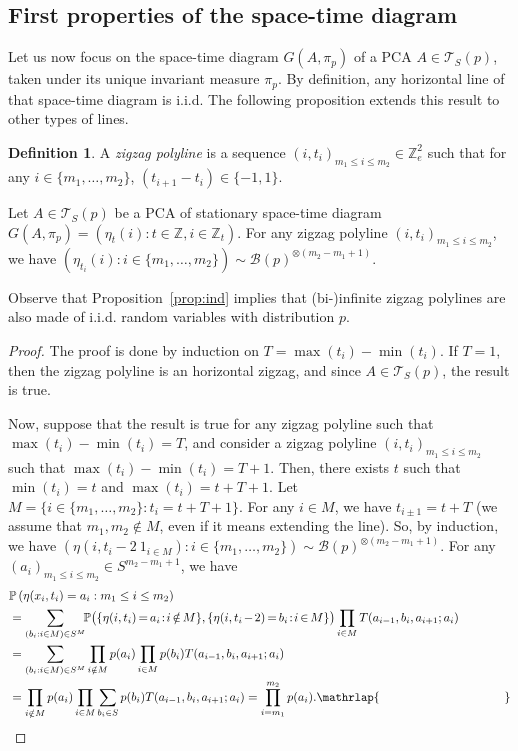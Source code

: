 \documentclass[10pt]{amsart}
\theoremstyle{definition}\newtheorem{defi}[theo]{Definition}\newtheorem{rema}[theo]{Remark}\newtheorem{exam}[theo]{Example}\newtheorem{exem}[theo]{Example}\newtheorem{nota}[theo]{Notation}
\newcounter{a}
\newcommand{\ind}[1]{1_{#1}}
\newcommand{\triang}[2]{\mathcal{T}_{#1} \left(#2 \right)}
\newcommand{\ZZ}{\mathbb{Z}}
\newcommand{\Z}{\mathbb{Z}}
\newcommand{\Pbb}{\mathbb{P}}
\newcommand*{\Mk}{\mkern -2mu}
\begin{document}
\subsection{First properties of the space-time diagram}

Let us now focus on the space-time diagram $G(A,\pi_p)$ of a PCA $A\in\triang{S}{p}$, taken under its unique invariant measure $\pi_p$. By definition, any horizontal line of that space-time diagram is i.i.d. The following proposition extends this result to other types of lines.

\begin{defi}\label{def:zigzagpolyline}
A \emph{zigzag polyline} is a sequence $(i,t_i)_{m_1\leq i\leq m_2}\in \Z_{e}^2$ such that for any $i\in\{m_1,\ldots, m_2\}$, $(t_{i+1}-t_i)\in\{-1,1\}$.
\end{defi}

\begin{prop}\label{prop:ind}
Let $A \in \triang{S}{p}$ be a PCA of stationary space-time diagram $G(A,\pi_p)=(\eta_t(i) : t \in \ZZ, i \in \ZZ_t)$. For any zigzag polyline $(i,t_i)_{m_1\leq i\leq m_2}$, we have $(\eta_{t_i}(i) : i \in \{m_1,\ldots,m_2\}) \sim \mathcal{B}(p)^{\otimes (m_2-m_1+1)}$.
\end{prop}

Observe that Proposition~\ref{prop:ind} implies that (bi-)infinite zigzag polylines are also made of i.i.d. random variables with distribution $p$.

\begin{proof}
The proof is done by induction on $T = \max(t_i) - \min(t_i)$. If $T = 1$, then the zigzag polyline is an horizontal zigzag, and since $A \in \triang{S}{p}$, the result is true.

Now, suppose that the result is true for any zigzag polyline such that $\max(t_i)-\min(t_i) = T$, and consider a zigzag polyline $(i,t_i)_{m_1\leq i\leq m_2}$ such that $\max(t_i) - \min(t_i) = T+1$. Then, there exists $t$ such that $\min(t_i) = t$ and $\max(t_i) =t+T+1$. Let $M = \{i \in \{m_1,\ldots,m_2\} : t_i = t+T+1\}$. For any $i \in M$, we have $t_{i\pm 1} = t+T$ (we assume that $m_1,m_2\notin M$, even if it means extending the line). So, by induction, we have $(\eta(i,t_i - 2\ \ind{i \in M}) : i \in \{m_1,\ldots,m_2\}) \sim \mathcal{B}(p)^{\otimes (m_2-m_1+1)}$. For any $(a_i)_{m_1 \leq i \leq m_2}\in S^{m_2-m_1+1}$, we have
\begin{align*}
&\Pbb\left(\eta(x_i,t_i) = a_i : m_1 \leq i \leq m_2\right)\\
& = \sum_{(b_i : i \in M) \in S^{M}} \!\!\Pbb\big(\{\eta(i,t_i) \Mk=\Mk a_i\!:\!i \Mk\notin\Mk M\},\{\eta(i,t_i\Mk-\Mk2) \Mk=\Mk b_i\!:\!i \Mk\in\Mk M\}\big) \prod_{i \in M} T(a_{i-1},b_i,a_{i+1} ; a_i) \\
& = \sum_{(b_i : i \in M) \in S^{M}} \prod_{i \notin M} p(a_i) \prod_{i \in M} p(b_i) T(a_{i-1},b_i,a_{i+1} ; a_i) \\
& = \prod_{i \notin M} p(a_i) \prod_{i \in M} \sum_{b_i \in S} p(b_i) T(a_{i-1},b_i,a_{i+1} ; a_i) = \prod_{i =m_1}^{m_2} p(a_i).\mathrlap{\mkern 185mu\qed}
\end{align*}
\let\qed\relax
\end{proof}
\end{document}

